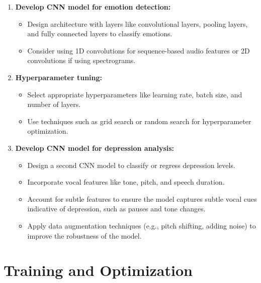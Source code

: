 \begin{enumerate}
    \item \textbf{Develop CNN model for emotion detection:}
    \begin{itemize}
        \item Design architecture with layers like convolutional layers, pooling layers, and fully connected layers to classify emotions.
        \item Consider using 1D convolutions for sequence-based audio features or 2D convolutions if using spectrograms.
    \end{itemize}
    \item \textbf{Hyperparameter tuning:}
    \begin{itemize}
        \item Select appropriate hyperparameters like learning rate, batch size, and number of layers.
        \item Use techniques such as grid search or random search for hyperparameter optimization.
    \end{itemize}
    \item \textbf{Develop CNN model for depression analysis:}
    \begin{itemize}
        \item Design a second CNN model to classify or regress depression levels.
        \item Incorporate vocal features like tone, pitch, and speech duration.
        \item Account for subtle features to ensure the model captures subtle vocal cues indicative of depression, such as pauses and tone changes.
        \item Apply data augmentation techniques (e.g., pitch shifting, adding noise) to improve the robustness of the model.
    \end{itemize}
\end{enumerate}

\section{Training and Optimization}

